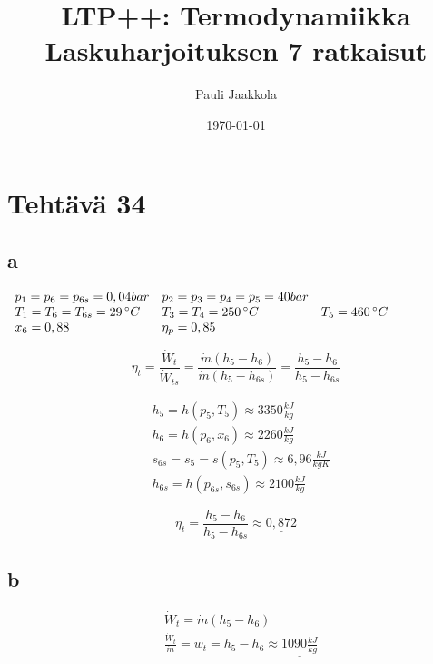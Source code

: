 \documentclass[12pt,a4paper,finnish]{article}
\title{LTP++: Termodynamiikka\\Laskuharjoituksen 7 ratkaisut}
\date{\today}
\author{Pauli Jaakkola}
\begin{document}
\maketitle
\tableofcontents
\newpage

\section{Tehtävä 34}

\subsection{a}

\begin{math}
 \begin{array}{l l l}
  p_1 = p_6 = p_{6s} = 0,04 bar & p_2 = p_3 = p_4 = p_5 = 40 bar &\\
  T_1 = T_6 = T_{6s} = 29 \,^{\circ}C & T_3 = T_4 = 250 \,^{\circ}C & T_5 = 460 \,^{\circ}C\\
  x_6 = 0,88 & \eta_p = 0,85 &\\
 \end{array}
\end{math}

\begin{equation}
 \eta_t = \frac{\dot{W}_t}{\dot{W}_{ts}} = \frac{\dot{m}(h_5 - h_6)}{\dot{m}(h_5 - h_{6s})} 
  = \frac{h_5 - h_6}{h_5 - h_{6s}}
\end{equation}

\begin{align}
 &h_5 = h(p_5, T_5) \approx 3350 \frac{kJ}{kg}\\
 &h_6 = h(p_6, x_6) \approx 2260 \frac{kJ}{kg}\\
 &s_{6s} = s_5 = s(p_5, T_5) \approx 6,96 \frac{kJ}{kgK}\\
 &h_{6s} = h(p_{6s}, s_{6s}) \approx 2100 \frac{kJ}{kg}
\end{align}

\begin{equation}
 \eta_t = \frac{h_5 - h_6}{h_5 - h_{6s}} \approx \underline{0,872}
\end{equation}

\subsection{b}

\begin{align}
 &\dot{W}_t = \dot{m}(h_5 - h_6)\\
 &\frac{\dot{W}_t}{\dot{m}} = w_t = h_5 - h_6 \approx \underline{1090 \frac{kJ}{kg}}
\end{align}
\end{document}
